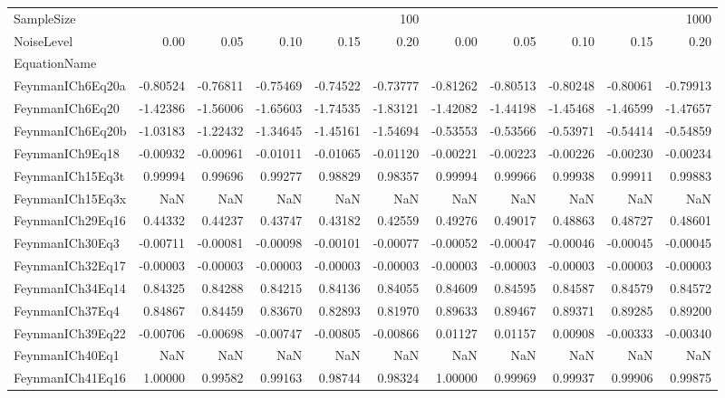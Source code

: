 \begin{tabular}{lrrrrrrrrrr}
\toprule
SampleSize & \multicolumn{5}{r}{100} & \multicolumn{5}{r}{1000} \\
NoiseLevel & 0.00 & 0.05 & 0.10 & 0.15 & 0.20 & 0.00 & 0.05 & 0.10 & 0.15 & 0.20 \\
EquationName &  &  &  &  &  &  &  &  &  &  \\
\midrule
FeynmanICh6Eq20a & -0.80524 & -0.76811 & -0.75469 & -0.74522 & -0.73777 & -0.81262 & -0.80513 & -0.80248 & -0.80061 & -0.79913 \\
FeynmanICh6Eq20 & -1.42386 & -1.56006 & -1.65603 & -1.74535 & -1.83121 & -1.42082 & -1.44198 & -1.45468 & -1.46599 & -1.47657 \\
FeynmanICh6Eq20b & -1.03183 & -1.22432 & -1.34645 & -1.45161 & -1.54694 & -0.53553 & -0.53566 & -0.53971 & -0.54414 & -0.54859 \\
FeynmanICh9Eq18 & -0.00932 & -0.00961 & -0.01011 & -0.01065 & -0.01120 & -0.00221 & -0.00223 & -0.00226 & -0.00230 & -0.00234 \\
FeynmanICh15Eq3t & 0.99994 & 0.99696 & 0.99277 & 0.98829 & 0.98357 & 0.99994 & 0.99966 & 0.99938 & 0.99911 & 0.99883 \\
FeynmanICh15Eq3x & NaN & NaN & NaN & NaN & NaN & NaN & NaN & NaN & NaN & NaN \\
FeynmanICh29Eq16 & 0.44332 & 0.44237 & 0.43747 & 0.43182 & 0.42559 & 0.49276 & 0.49017 & 0.48863 & 0.48727 & 0.48601 \\
FeynmanICh30Eq3 & -0.00711 & -0.00081 & -0.00098 & -0.00101 & -0.00077 & -0.00052 & -0.00047 & -0.00046 & -0.00045 & -0.00045 \\
FeynmanICh32Eq17 & -0.00003 & -0.00003 & -0.00003 & -0.00003 & -0.00003 & -0.00003 & -0.00003 & -0.00003 & -0.00003 & -0.00003 \\
FeynmanICh34Eq14 & 0.84325 & 0.84288 & 0.84215 & 0.84136 & 0.84055 & 0.84609 & 0.84595 & 0.84587 & 0.84579 & 0.84572 \\
FeynmanICh37Eq4 & 0.84867 & 0.84459 & 0.83670 & 0.82893 & 0.81970 & 0.89633 & 0.89467 & 0.89371 & 0.89285 & 0.89200 \\
FeynmanICh39Eq22 & -0.00706 & -0.00698 & -0.00747 & -0.00805 & -0.00866 & 0.01127 & 0.01157 & 0.00908 & -0.00333 & -0.00340 \\
FeynmanICh40Eq1 & NaN & NaN & NaN & NaN & NaN & NaN & NaN & NaN & NaN & NaN \\
FeynmanICh41Eq16 & 1.00000 & 0.99582 & 0.99163 & 0.98744 & 0.98324 & 1.00000 & 0.99969 & 0.99937 & 0.99906 & 0.99875 \\

\end{tabular}
